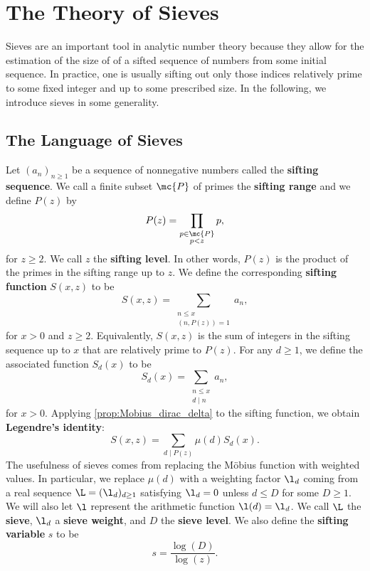 \chapter{The Theory of Sieves}
  Sieves are an important tool in analytic number theory because they allow for the estimation of the size of of a sifted sequence of numbers from some initial sequence. In practice, one is usually sifting out only those indices relatively prime to some fixed integer and up to some prescribed size. In the following, we introduce sieves in some generality.
  \section{The Language of Sieves}
    Let $(a_{n})_{n \ge 1}$ be a sequence of nonnegative numbers called the \textbf{sifting sequence}. We call a finite subset $\mc{P}$ of primes the \textbf{sifting range} and we define $P(z)$ by
    \[
      P(z) = \prod_{\substack{p \in \mc{P} \\ p < z}}p,
    \]
    for $z \ge 2$. We call $z$ the \textbf{sifting level}. In other words, $P(z)$ is the product of the primes in the sifting range up to $z$. We define the corresponding \textbf{sifting function} $S(x,z)$ to be
    \[
      S(x,z) = \sum_{\substack{n \le x \\ (n,P(z)) = 1}}a_{n},
    \]
    for $x > 0$ and $z \ge 2$. Equivalently, $S(x,z)$ is the sum of integers in the sifting sequence up to $x$ that are relatively prime to $P(z)$. For any $d \ge 1$, we define the associated function $S_{d}(x)$ to be
    \[
      S_{d}(x) = \sum_{\substack{n \le x \\ d \mid n}}a_{n},
    \]
    for $x > 0$. Applying \cref{prop:Mobius_dirac_delta} to the sifting function, we obtain \textbf{Legendre's identity}:
    \[
      S(x,z) = \sum_{d \mid P(z)}\mu(d)S_{d}(x).
    \]
    The usefulness of sieves comes from replacing the M\"obius function with weighted values. In particular, we replace $\mu(d)$ with a weighting factor $\l_{d}$ coming from a real sequence $\L = (\l_{d})_{d \ge 1}$ satisfying $\l_{d} = 0$ unless $d \le D$ for some $D \ge 1$. We will also let $\l$ represent the arithmetic function $\l(d) = \l_{d}$. We call $\L$ the \textbf{sieve}, $\l_{d}$ a \textbf{sieve weight}, and $D$ the \textbf{sieve level}. We also define the \textbf{sifting variable} $s$ to be
    \[
      s = \frac{\log(D)}{\log(z)}.
    \]

